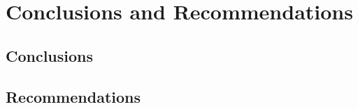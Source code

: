 \documentclass[conf]{new-aiaa}
\begin{document}

\section{Conclusions and Recommendations}
\subsection{Conclusions}

\subsection{Recommendations}
\end{document}

